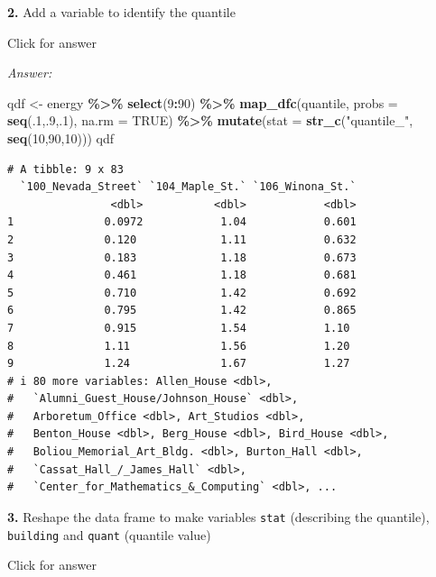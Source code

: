 \documentclass[
]{book}
\newenvironment{Shaded}{\begin{snugshade}}{\end{snugshade}}
\newcommand{\AttributeTok}[1]{\textcolor[rgb]{0.13,0.29,0.53}{#1}}
\newcommand{\ConstantTok}[1]{\textcolor[rgb]{0.56,0.35,0.01}{#1}}
\newcommand{\DecValTok}[1]{\textcolor[rgb]{0.00,0.00,0.81}{#1}}
\newcommand{\FunctionTok}[1]{\textcolor[rgb]{0.13,0.29,0.53}{\textbf{#1}}}
\newcommand{\NormalTok}[1]{#1}
\newcommand{\OtherTok}[1]{\textcolor[rgb]{0.56,0.35,0.01}{#1}}
\newcommand{\SpecialCharTok}[1]{\textcolor[rgb]{0.81,0.36,0.00}{\textbf{#1}}}
\newcommand{\StringTok}[1]{\textcolor[rgb]{0.31,0.60,0.02}{#1}}
\begin{document}
\textbf{2.} Add a variable to identify the quantile

Click for answer

\emph{Answer:}

\begin{Shaded}
\begin{Highlighting}[]
\NormalTok{qdf }\OtherTok{\textless{}{-}}\NormalTok{ energy }\SpecialCharTok{\%\textgreater{}\%} \FunctionTok{select}\NormalTok{(}\DecValTok{9}\SpecialCharTok{:}\DecValTok{90}\NormalTok{) }\SpecialCharTok{\%\textgreater{}\%}
  \FunctionTok{map\_dfc}\NormalTok{(quantile, }\AttributeTok{probs =} \FunctionTok{seq}\NormalTok{(.}\DecValTok{1}\NormalTok{,.}\DecValTok{9}\NormalTok{,.}\DecValTok{1}\NormalTok{), }\AttributeTok{na.rm =} \ConstantTok{TRUE}\NormalTok{) }\SpecialCharTok{\%\textgreater{}\%}  
  \FunctionTok{mutate}\NormalTok{(}\AttributeTok{stat =} \FunctionTok{str\_c}\NormalTok{(}\StringTok{"quantile\_"}\NormalTok{, }\FunctionTok{seq}\NormalTok{(}\DecValTok{10}\NormalTok{,}\DecValTok{90}\NormalTok{,}\DecValTok{10}\NormalTok{))) }
\NormalTok{qdf}
\end{Highlighting}
\end{Shaded}

\begin{verbatim}
# A tibble: 9 x 83
  `100_Nevada_Street` `104_Maple_St.` `106_Winona_St.`
                <dbl>           <dbl>            <dbl>
1              0.0972            1.04            0.601
2              0.120             1.11            0.632
3              0.183             1.18            0.673
4              0.461             1.18            0.681
5              0.710             1.42            0.692
6              0.795             1.42            0.865
7              0.915             1.54            1.10 
8              1.11              1.56            1.20 
9              1.24              1.67            1.27 
# i 80 more variables: Allen_House <dbl>,
#   `Alumni_Guest_House/Johnson_House` <dbl>,
#   Arboretum_Office <dbl>, Art_Studios <dbl>,
#   Benton_House <dbl>, Berg_House <dbl>, Bird_House <dbl>,
#   Boliou_Memorial_Art_Bldg. <dbl>, Burton_Hall <dbl>,
#   `Cassat_Hall_/_James_Hall` <dbl>,
#   `Center_for_Mathematics_&_Computing` <dbl>, ...
\end{verbatim}

\textbf{3.} Reshape the data frame to make variables \texttt{stat} (describing the quantile), \texttt{building} and \texttt{quant} (quantile value)

Click for answer
\end{document}
